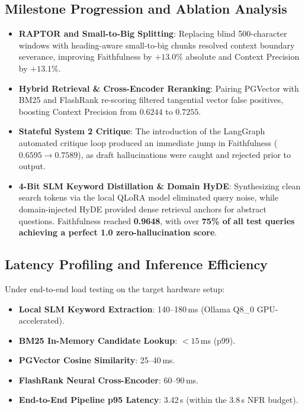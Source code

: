 \documentclass[sigconf,nonacm]{acmart}
\begin{document}
\subsection{Milestone Progression and Ablation Analysis}
\begin{itemize}
    \item \textbf{RAPTOR and Small-to-Big Splitting}: Replacing blind 500-character windows with heading-aware small-to-big chunks resolved context boundary severance, improving Faithfulness by $+13.0\%$ absolute and Context Precision by $+13.1\%$.
    \item \textbf{Hybrid Retrieval \& Cross-Encoder Reranking}: Pairing PGVector with BM25 and FlashRank re-scoring filtered tangential vector false positives, boosting Context Precision from $0.6244$ to $0.7255$.
    \item \textbf{Stateful System 2 Critique}: The introduction of the LangGraph automated critique loop produced an immediate jump in Faithfulness ($0.6595 \to 0.7589$), as draft hallucinations were caught and rejected prior to output.
    \item \textbf{4-Bit SLM Keyword Distillation \& Domain HyDE}: Synthesizing clean search tokens via the local QLoRA model eliminated query noise, while domain-injected HyDE provided dense retrieval anchors for abstract questions. Faithfulness reached \textbf{0.9648}, with over \textbf{75\% of all test queries achieving a perfect 1.0 zero-hallucination score}.
\end{itemize}

\subsection{Latency Profiling and Inference Efficiency}
Under end-to-end load testing on the target hardware setup:
\begin{itemize}
    \item \textbf{Local SLM Keyword Extraction}: 140--180\,ms (Ollama Q8\_0 GPU-accelerated).
    \item \textbf{BM25 In-Memory Candidate Lookup}: $<15$\,ms (p99).
    \item \textbf{PGVector Cosine Similarity}: 25--40\,ms.
    \item \textbf{FlashRank Neural Cross-Encoder}: 60--90\,ms.
    \item \textbf{End-to-End Pipeline p95 Latency}: 3.42\,s (within the 3.8\,s NFR budget).
\end{itemize}
\end{document}
